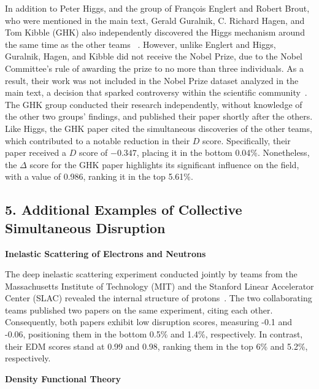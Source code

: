 \documentclass[12pt]{article}
\begin{document}
\begin{refsection}
In addition to Peter Higgs, and the group of François Englert and Robert Brout, who were mentioned in the main text, Gerald Guralnik, C. Richard Hagen, and Tom Kibble (GHK) also independently discovered the Higgs mechanism around the same time as the other teams ~\cite{englert1964broken, higgs1964broken, guralnik1964global, guralnik2009history}. However, unlike Englert and Higgs, Guralnik, Hagen, and Kibble did not receive the Nobel Prize, due to the Nobel Committee's rule of awarding the prize to no more than three individuals. As a result, their work was not included in the Nobel Prize dataset analyzed in the main text, a decision that sparked controversy within the scientific community~\cite{merali2010physicists}. The GHK group conducted their research independently, without knowledge of the other two groups' findings, and published their paper shortly after the others. Like Higgs, the GHK paper cited the simultaneous discoveries of the other teams, which contributed to a notable reduction in their $D$ score. Specifically, their paper received a $D$ score of $-0.347$, placing it in the bottom 0.04\%. Nonetheless, the $\Delta$ score for the GHK paper highlights its significant influence on the field, with a value of 0.986, ranking it in the top 5.61\%.












\subsection*{5. Additional Examples of Collective Simultaneous Disruption}
\label{suppinfo:example_collective}


\textbf{Inelastic Scattering of Electrons and Neutrons}

The deep inelastic scattering experiment conducted jointly by teams from the Massachusetts Institute of Technology (MIT) and the Stanford Linear Accelerator Center (SLAC) revealed the internal structure of protons~\cite{bloom1969high,breidenbach1969observed}. The two collaborating teams published two papers on the same experiment, citing each other. Consequently, both papers exhibit low disruption scores, measuring -0.1 and -0.06, positioning them in the bottom 0.5\% and 1.4\%, respectively. In contrast, their EDM scores stand at 0.99 and 0.98, ranking them in the top 6\% and 5.2\%, respectively.


\normalsize
\textbf{Density Functional Theory}


\end{refsection}
\end{document}
